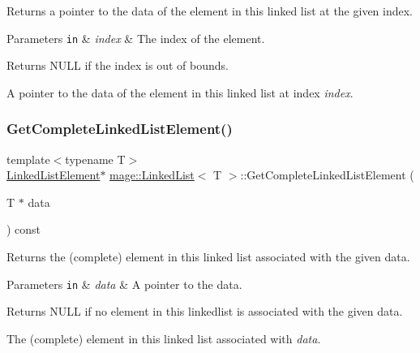 Returns a pointer to the data of the element in this linked list at the given index.


\begin{DoxyParams}[1]{Parameters}
\mbox{\tt in}  & {\em index} & The index of the element. \\
\hline
\end{DoxyParams}
\begin{DoxyReturn}{Returns}
{\ttfamily N\+U\+LL} if the index is out of bounds. 

A pointer to the data of the element in this linked list at index {\itshape index}. 
\end{DoxyReturn}
\hypertarget{classmage_1_1_linked_list_a0da4ff247abafd3a496b379673c111c1}{}\label{classmage_1_1_linked_list_a0da4ff247abafd3a496b379673c111c1} 
\subsubsection{\texorpdfstring{Get\+Complete\+Linked\+List\+Element()}{GetCompleteLinkedListElement()}}
{\footnotesize\ttfamily template$<$typename T$>$ \\
\hyperlink{structmage_1_1_linked_list_1_1_linked_list_element}{Linked\+List\+Element}$\ast$ \hyperlink{classmage_1_1_linked_list}{mage\+::\+Linked\+List}$<$ T $>$\+::Get\+Complete\+Linked\+List\+Element (\begin{DoxyParamCaption}\item[{T $\ast$}]{data }\end{DoxyParamCaption}) const}

Returns the (complete) element in this linked list associated with the given data.


\begin{DoxyParams}[1]{Parameters}
\mbox{\tt in}  & {\em data} & A pointer to the data. \\
\hline
\end{DoxyParams}
\begin{DoxyReturn}{Returns}
{\ttfamily N\+U\+LL} if no element in this linkedlist is associated with the given data. 

The (complete) element in this linked list associated with {\itshape data}. 
\end{DoxyReturn}
\hypertarget{classmage_1_1_linked_list_a8394fd1c390b806b9daafdff497b02fb}{}\label{classmage_1_1_linked_list_a8394fd1c390b806b9daafdff497b02fb} 
